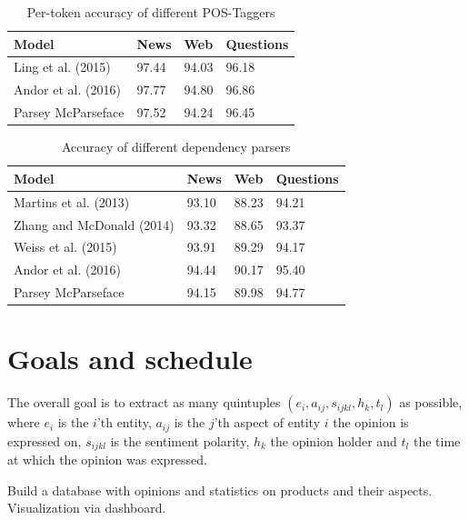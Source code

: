\documentclass[10pt,a4paper]{article}
\begin{document}
	\begin{table}[h]
		\centering
		\caption{Per-token accuracy of different POS-Taggers}
		\label{tab:posaccuracy}
		\begin{tabular}{|l|l|l|l|}
			\hline
			Model & News & Web & Questions \\
			\hline
			Ling et al. (2015) & 97.44 & 94.03 & 96.18 \\
			\hline
			Andor et al. (2016) & 97.77 & 94.80 & 96.86 \\
			\hline
			Parsey McParseface & 97.52 & 94.24 & 96.45 \\
			\hline
		\end{tabular}
	\end{table}
	
	\begin{table}[h]
		\centering
		\caption{Accuracy of different dependency parsers}
		\label{tab:parseraccuracy}
		\begin{tabular}{|l|l|l|l|}
			\hline
			Model & News & Web & Questions \\
			\hline
			Martins et al. (2013) & 93.10 & 88.23 & 94.21 \\
			\hline
			Zhang and McDonald (2014) & 93.32 & 88.65 & 93.37 \\
			\hline
			Weiss et al. (2015) & 93.91 & 89.29 & 94.17 \\
			\hline
			Andor et al. (2016) & 94.44 & 90.17 & 95.40 \\
			\hline
			Parsey McParseface & 94.15 & 89.98 & 94.77 \\
			\hline
		\end{tabular}
	\end{table}

	\section{Goals and schedule}
	The overall goal is to extract as many quintuples $(e_i, a_{ij}, s_{ijkl}, h_k, t_l)$ as possible, where $e_i$ is the $i$'th entity, $a_{ij}$ is the $j$'th aspect of entity $i$ the opinion is expressed on, $s_{ijkl}$ is the sentiment polarity, $h_k$ the opinion holder and $t_l$ the time at which the opinion was expressed.
	
	Build a database with opinions and statistics on products and their aspects.
	Visualization via dashboard.

	\newpage

	\nocite{DBLP:journals/corr/AndorAWSPGPC16}
	\nocite{Liu12sentimentanalysis}
	\nocite{Zhang2014}
	\nocite{pennington2014glove}
	\nocite{syntaxnet}
	\nocite{Ding:2008:HLA:1341531.1341561}
	\nocite{Hu:2004:MSC:1014052.1014073}

	
	
\end{document}
